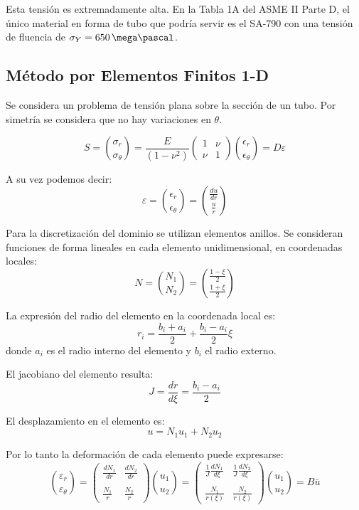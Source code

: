 Esta tensi\'on es extremadamente alta. En la Tabla 1A del ASME II Parte D, el \'unico material en forma de tubo que podr\'ia servir es el SA-790 con una tensi\'on de fluencia de $\sigma_Y=650\,\mega\pascal$.


\subsection{M\'etodo por Elementos Finitos 1-D}
Se considera un problema de tensi\'on plana sobre la secci\'on de un tubo. Por simetr\'ia se considera que no hay variaciones en $ \theta $.

\begin{equation}
S=\binom{\sigma_r}{\sigma_\theta}
= \frac{E}{(1-\nu^2)}
\begin{pmatrix}
1 & \nu \\
\nu & 1
\end{pmatrix}
\binom{\epsilon_r}{\epsilon_\theta}
=D \varepsilon
\end{equation}

A su vez podemos decir:
\begin{equation}
\varepsilon=
\binom{\epsilon_r}{\epsilon_\theta}=
\binom{\frac{du}{dr}}{\frac{u}{r}}
\end{equation}

Para la discretizaci\'on del dominio se utilizan elementos anillos. Se consideran funciones de forma lineales en cada elemento unidimensional, en coordenadas locales:
\begin{equation}
N=\binom{N_1}{N_2}=\binom{\frac{1-\xi}{2}}{\frac{1+\xi}{2}}
\end{equation}

La expresi\'on del radio del elemento en la coordenada local es:
\begin{equation}
r_i=\frac{b_i+a_i}{2}+\frac{b_i-a_i}{2}\xi
\end{equation}
donde $a_i$ es el radio interno del elemento y $b_i$ el radio externo.

El jacobiano del elemento resulta:
\begin{equation}
J=\frac{dr}{d\xi}=\frac{b_i-a_i}{2}
\end{equation}

El desplazamiento en el elemento es:
\begin{equation}
u=N_1 u_1+N_2 u_2
\end{equation}

Por lo tanto la deformaci\'on de cada elemento puede expresarse:
\begin{equation}
\binom{\varepsilon_r}{\varepsilon_\theta}=
\begin{pmatrix}
\frac{dN_1}{dr} & \frac{dN_2}{dr} \\
\\
\frac{N_1}{r} & \frac{N_2}{r}
\end{pmatrix}
\binom{u_1}{u_2}=
\begin{pmatrix}
\frac{1}{J}\frac{dN_1}{d\xi} & \frac{1}{J}\frac{dN_2}{d\xi} \\
\\
\frac{N_1}{r(\xi)} & \frac{N_2}{r(\xi)}
\end{pmatrix}
\binom{u_1}{u_2}=
B\bar{u}
\end{equation}

